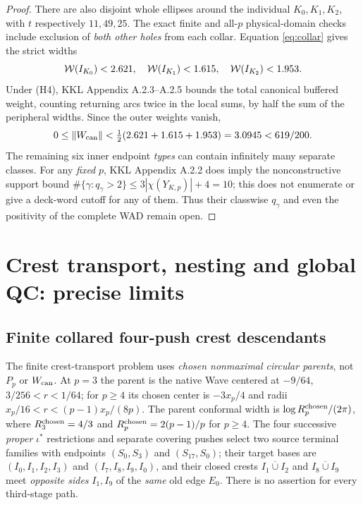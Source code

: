 \begin{proof}
There are also disjoint
whole ellipses around
the individual $K_0,K_1,K_2$,
with $t$ respectively
$11,49,25$.  The exact
finite and all-$p$
physical-domain checks
include exclusion of
\emph{both other holes}
from each collar.
Equation \eqref{eq:collar}
gives the strict widths
\[
 \mathcal W(I_{K_0})<2.621,\quad
 \mathcal W(I_{K_1})<1.615,\quad
 \mathcal W(I_{K_2})<1.953.
\]
Under (H4), KKL Appendix A.2.3--A.2.5
bounds the total canonical
buffered weight, counting
returning arcs twice in
the local sums, by half
the sum of the peripheral
widths.  Since the outer
weights vanish,
\[
 0\le\lVert W_{\rm can}\rVert
 <\tfrac12(2.621+1.615+1.953)
 =3.0945<619/200.
\]
The remaining six
inner endpoint \emph{types}
can contain infinitely
many separate classes.
For any \emph{fixed} $p$,
KKL Appendix A.2.2 does imply
the nonconstructive support bound
$\#\{\gamma:q_\gamma>2\}
\le 3|\chi(Y_{K,p})|+4=10$;
this does not enumerate or give
a deck-word cutoff for any of them.
Thus
their classwise $q_\gamma$
and even the positivity
of the complete WAD
remain open.
\end{proof}

\section{Crest transport, nesting and global QC: precise limits}
\label{sec:limits}
\subsection{Finite collared four-push crest descendants}
The finite crest-transport problem uses
\emph{chosen nonmaximal circular parents},
not $P_p$ or $W_{\rm can}$.
At $p=3$ the parent is the native
Wave centered at $-9/64$,
$3/256<r<1/64$; for $p\ge4$
its chosen center is $-3x_p/4$
and radii $x_p/16<r<(p-1)x_p/(8p)$.
The parent conformal width is
$\log R_p^{\rm chosen}/(2\pi)$,
where $R_3^{\rm chosen}=4/3$
and $R_p^{\rm chosen}=2(p-1)/p$
for $p\ge4$.  The four
successive \emph{proper}
$\iota^*$ restrictions and
separate covering pushes
select two source terminal
families with endpoints
$(S_0,S_3)$ and
$(S_{17},S_0)$; their
target bases are
$(I_0,I_1,I_2,I_3)$
and $(I_7,I_8,I_9,I_0)$,
and their closed crests
$\overline{I_1\cup I_2}$
and $\overline{I_8\cup I_9}$
meet \emph{opposite sides}
$I_1,I_9$ of the \emph{same}
old edge $E_0$.
There is no assertion for
every third-stage path.

